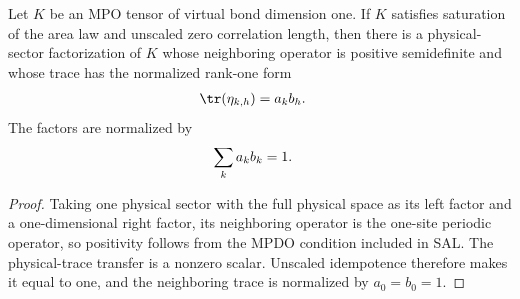 \begin{lemma}
    \label{thm:mpdo_bond_one_physical_sector_factorization}
    \leanok
    Let $K$ be an MPO tensor of virtual bond dimension one. If $K$ satisfies
    saturation of the area law and unscaled zero correlation length, then there is a
    physical-sector factorization of $K$ whose neighboring operator is
    positive semidefinite and whose trace has the normalized rank-one form
    \begin{align}
        \tr(\eta_{k,h}) & =a_kb_h.
        \notag
    \end{align}
    The factors are normalized by
    \begin{align}
        \sum_k a_kb_k & =1.
        \notag
    \end{align}
\end{lemma}
\begin{proof}\leanok
    Taking one physical sector with the full physical space as its left factor
    and a one-dimensional right factor, its neighboring operator is the
    one-site periodic operator, so positivity follows from the MPDO condition
    included in SAL. The physical-trace transfer is a nonzero scalar. Unscaled
    idempotence therefore makes it equal to one, and the neighboring trace is
    normalized by $a_0=b_0=1$.
\end{proof}

